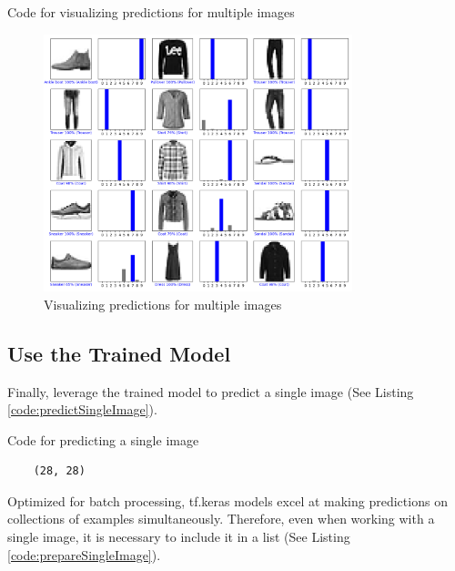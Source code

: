 \begin{code}[h!]
	    
	
	\caption{Code for visualizing predictions for multiple images}
	\label{code:predictionPlots}
\end{code}

\begin{figure}[h!]
	\centering
	\includegraphics[width=0.8\textwidth]{Images/TensorFlowPackage/predictionPlots}
	\caption{Visualizing predictions for multiple images} \label{fig:predictionPlots}
\end{figure}

\subsection{Use the Trained Model}

Finally, leverage the trained model to predict a single image (See Listing \ref{code:predictSingleImage}).

\begin{code}[h!]
	    
	
	\caption{Code for predicting a single image}
	\label{code:predictSingleImage}
\end{code}

\begin{verbatim}
	(28, 28)
\end{verbatim}

Optimized for batch processing, tf.keras models excel at making predictions on collections of examples simultaneously. Therefore, even when working with a single image, it is necessary to include it in a list (See Listing \ref{code:prepareSingleImage}).

